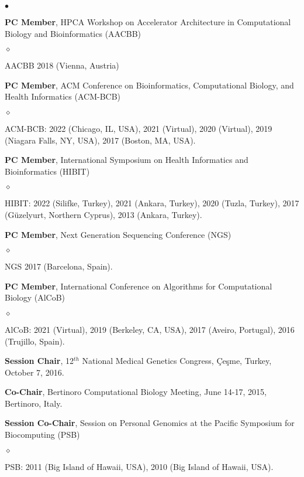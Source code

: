 \documentclass[margin,line]{res}
\newenvironment{list2}{
  \begin{list}{$\bullet$}{%
      \setlength{\itemsep}{0.1cm}
      \setlength{\parsep}{0in} \setlength{\parskip}{0in}
      \setlength{\topsep}{0in} \setlength{\partopsep}{0in} 
      \setlength{\leftmargin}{0.2in}}}{\end{list}}
\newenvironment{list3}{
  \begin{list}{$\diamond$}{%
      \setlength{\itemsep}{0in}
      \setlength{\parsep}{0.1cm} \setlength{\parskip}{0.1cm}
      \setlength{\topsep}{0.1cm} \setlength{\partopsep}{0.1cm} 
      \setlength{\leftmargin}{0.2in}}}{\end{list}}
\begin{document}
\begin{resume}
\begin{list2}
\item
  \textbf{PC Member}, 
HPCA Workshop on Accelerator Architecture in Computational Biology and Bioinformatics (AACBB)
\begin{list3}
    \item AACBB 2018 (Vienna, Austria)
\end{list3}

\item
  \textbf{PC Member},  ACM Conference on Bioinformatics, Computational Biology, and Health Informatics
  (ACM-BCB)
  \begin{list3}
    \item ACM-BCB: 2022 (Chicago, IL, USA), 2021 (Virtual),  2020 (Virtual), 2019 (Niagara Falls, NY, USA), 2017 (Boston, MA, USA).
  \end{list3}

\item
  \textbf{PC Member},  International Symposium on Health Informatics and Bioinformatics
  (HIBIT)
  \begin{list3}
  \item HIBIT: 2022 (Silifke, Turkey),  2021 (Ankara, Turkey),  2020 (Tuzla, Turkey),  2017 (Güzelyurt, Northern Cyprus),  2013 (Ankara, Turkey).
  \end{list3}

\item
  \textbf{PC Member},  Next Generation Sequencing Conference (NGS)
  \begin{list3}
  \item NGS 2017 (Barcelona, Spain).
  \end{list3}


\item
  \textbf{PC Member}, International Conference on Algorithms for Computational Biology (AlCoB)
  \begin{list3}
   \item AlCoB: 2021 (Virtual),  2019 (Berkeley, CA, USA),  2017 (Aveiro, Portugal),  2016 (Trujillo, Spain).
  \end{list3}
  
\item
  \textbf{Session Chair}, 12$^{th}$ National Medical Genetics Congress, Çeşme, Turkey, October 7, 2016.

\item
  \textbf{Co-Chair}, Bertinoro Computational Biology Meeting, June 14-17, 2015, Bertinoro, Italy.



\item 
  \textbf{Session Co-Chair}, Session on Personal Genomics at the Pacific Symposium for Biocomputing (PSB)
    \begin{list3}
    \item PSB: 2011 (Big Island of Hawaii, USA), 2010 (Big Island of Hawaii, USA).
    \end{list3}



\end{list2}
\end{resume}
\end{document}
